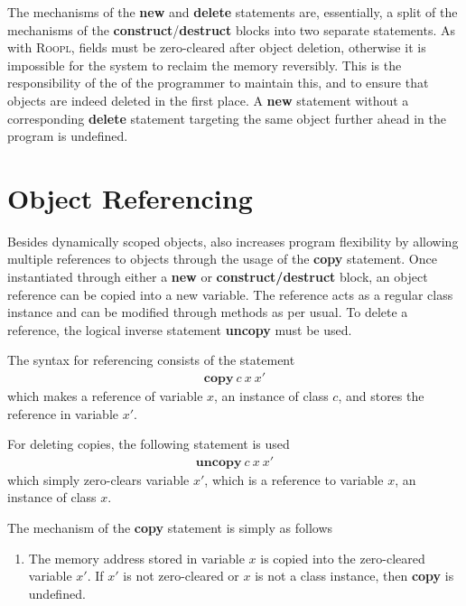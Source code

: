 The mechanisms of the \textbf{new} and \textbf{delete} statements are, essentially, a split of the mechanisms of the \textbf{construct}/\textbf{destruct} blocks into two separate statements. As with \textsc{Roopl}, fields must be zero-cleared after object deletion, otherwise it is impossible for the system to reclaim the memory reversibly. This is the responsibility of the of the programmer to maintain this, and to ensure that objects are indeed deleted in the first place. A \textbf{new} statement without a corresponding \textbf{delete} statement targeting the same object further ahead in the program is undefined.

\section{Object Referencing}
Besides dynamically scoped objects, \rooplpp also increases program flexibility by allowing multiple references to objects through the usage of the \textbf{copy} statement. Once instantiated through either a \textbf{new} or \textbf{construct/destruct} block, an object reference can be copied into a new variable. The reference acts as a regular class instance and can be modified through methods as per usual. To delete a reference, the logical inverse statement \textbf{uncopy} must be used.

The syntax for referencing consists of the statement
\begin{align*}
    \textbf{copy}\ c\ x\ x'
\end{align*}
which makes a reference of variable $x$, an instance of class $c$, and stores the reference in variable $x'$.

For deleting copies, the following statement is used
\begin{align*}
    \textbf{uncopy}\ c\ x\ x'
\end{align*}    
which simply zero-clears variable $x'$, which is a reference to variable $x$, an instance of class $x$.

The mechanism of the \textbf{copy} statement is simply as follows
\begin{enumerate}
    \item The memory address stored in variable $x$ is copied into the zero-cleared variable $x'$. If $x'$ is not zero-cleared or $x$ is not a class instance, then \textbf{copy} is undefined.
\end{enumerate}

